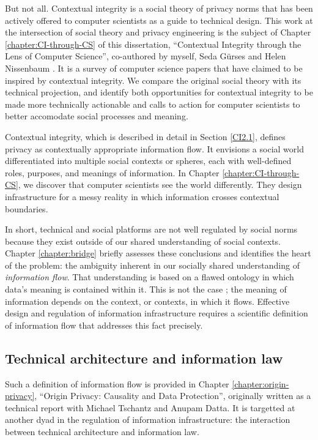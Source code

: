 \documentclass[../thesis.tex]{subfiles}
\begin{document}
 But not all.
 Contextual integrity is a social theory of privacy norms
 that has been actively offered to computer scientists
 as a guide to technical design.
 This work at the intersection of social theory and
 privacy engineering is the subject of 
 Chapter \ref{chapter:CI-through-CS} of this
 dissertation, ``Contextual Integrity through the Lens of Computer Science'', co-authored by myself, Seda G{\"u}rses and Helen Nissenbaum \cite{benthall2017contextual}.
 It is a survey of computer science papers that have claimed
 to be inspired by contextual integrity.
 We compare the original social theory with its technical projection, and identify both opportunities for contextual integrity to be made more technically actionable and calls to action for computer scientists to better accomodate social processes and meaning.

 Contextual integrity, which is described in detail in
 Section \ref{CI2.1}, defines privacy as contextually
 appropriate information flow.
 It envisions a social world differentiated into multiple
 social contexts or spheres, each with well-defined
 roles, purposes, and meanings of information.
 In Chapter \ref{chapter:CI-through-CS}, we discover that
 computer scientists see the world differently.
 They design infrastructure for a messy reality in which
 information crosses contextual boundaries.

 In short, technical and social platforms are not well
 regulated by social norms because they exist outside
 of our shared understanding of social contexts.
 Chapter \ref{chapter:bridge} briefly assesses these conclusions
 and identifies the  heart of the problem:
 the ambiguity inherent in our socially shared
 understanding of \textit{information flow}.
 That understanding is based on a flawed ontology
 in which data's meaning is contained within it.
 This is not the case \cite{horvitz2015data};
 the meaning of information depends on the context,
 or contexts, in which it flows.
 Effective design and regulation of information
 infrastructure requires a scientific
 definition of information flow that addresses this
 fact precisely.
 
 \subsection{Technical architecture and information law}

 Such a definition of information flow is provided in
 Chapter \ref{chapter:origin-privacy},
 ``Origin Privacy: Causality and Data Protection'', originally
 written as a technical report
 with Michael Tschantz and Anupam Datta. 
 It is targetted at another dyad in the regulation of information
 infrastructure: the interaction between technical architecture
 and information law.
\end{document}

